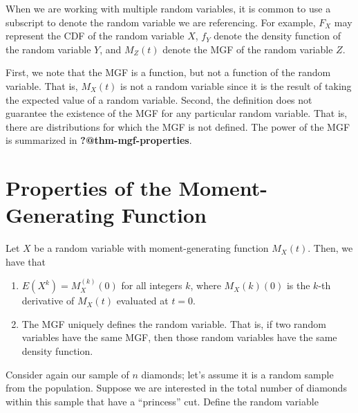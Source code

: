 \documentclass[
  letterpaper,
  DIV=11,
  numbers=noendperiod]{scrreprt}
\providecommand{\tightlist}{%
  \setlength{\itemsep}{0pt}\setlength{\parskip}{0pt}}\usepackage{longtable,booktabs,array}
\theoremstyle{definition}
\theoremstyle{plain}
\theoremstyle{definition}
\theoremstyle{remark}
\begin{document}
\begin{tcolorbox}[enhanced jigsaw, rightrule=.15mm, leftrule=.75mm, opacityback=0, coltitle=black, bottomrule=.15mm, opacitybacktitle=0.6, left=2mm, colframe=quarto-callout-note-color-frame, breakable, colback=white, arc=.35mm, toprule=.15mm, toptitle=1mm, bottomtitle=1mm, title=\textcolor{quarto-callout-note-color}{\faInfo}\hspace{0.5em}{Note}, titlerule=0mm, colbacktitle=quarto-callout-note-color!10!white]

When we are working with multiple random variables, it is common to use
a subscript to denote the random variable we are referencing. For
example, \(F_X\) may represent the CDF of the random variable \(X\),
\(f_Y\) denote the density function of the random variable \(Y\), and
\(M_Z(t)\) denote the MGF of the random variable \(Z\).

\end{tcolorbox}

First, we note that the MGF is a function, but not a function of the
random variable. That is, \(M_X(t)\) is not a random variable since it
is the result of taking the expected value of a random variable. Second,
the definition does not guarantee the existence of the MGF for any
particular random variable. That is, there are distributions for which
the MGF is not defined. The power of the MGF is summarized in
\textbf{?@thm-mgf-properties}.

\section{Properties of the Moment-Generating
Function}\label{properties-of-the-moment-generating-function}

Let \(X\) be a random variable with moment-generating function
\(M_X(t).\) Then, we have that

\begin{enumerate}
\def\labelenumi{\arabic{enumi}.}
\tightlist
\item
  \(E\left(X^k\right) = M_X^{(k)}(0)\) for all integers \(k\), where
  \(M_X(k)(0)\) is the \(k\)-th derivative of \(M_X(t)\) evaluated at
  \(t = 0\).
\item
  The MGF uniquely defines the random variable. That is, if two random
  variables have the same MGF, then those random variables have the same
  density function.
\end{enumerate}

Consider again our sample of \(n\) diamonds; let's assume it is a random
sample from the population. Suppose we are interested in the total
number of diamonds within this sample that have a ``princess'' cut.
Define the random variable
\end{document}
